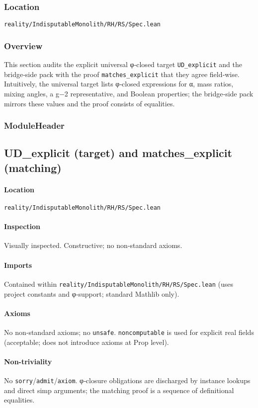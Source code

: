 \documentclass{article}
\newcommand{\FileRef}[1]{\texttt{#1}}
\newcommand{\ModuleHeader}[3]{%
  \subsection{#1}
  \paragraph{Location} \FileRef{#2}\\
  \paragraph{Inspection} #3
}
\begin{document}
\subsubsection{Location}
\FileRef{reality/IndisputableMonolith/RH/RS/Spec.lean}

\subsubsection{Overview}
This section audits the explicit universal φ‑closed target \texttt{UD\_explicit} and the bridge‑side pack with the proof \texttt{matches\_explicit} that they agree field‑wise. Intuitively, the universal target lists φ‑closed expressions for α, mass ratios, mixing angles, a g−2 representative, and Boolean properties; the bridge‑side pack mirrors these values and the proof consists of equalities.

\subsubsection{ModuleHeader}
\ModuleHeader{UD\_explicit (target) and matches\_explicit (matching)}{reality/IndisputableMonolith/RH/RS/Spec.lean}{Visually inspected. Constructive; no non‑standard axioms.}

\paragraph{Imports}
Contained within \FileRef{reality/IndisputableMonolith/RH/RS/Spec.lean} (uses project constants and φ‑support; standard Mathlib only).

\paragraph{Axioms}
No non‑standard axioms; no \texttt{unsafe}. \texttt{noncomputable} is used for explicit real fields (acceptable; does not introduce axioms at Prop level).

\paragraph{Non-triviality}
No \texttt{sorry}/\texttt{admit}/\texttt{axiom}. φ‑closure obligations are discharged by instance lookups and direct simp arguments; the matching proof is a sequence of definitional equalities.
\end{document}

